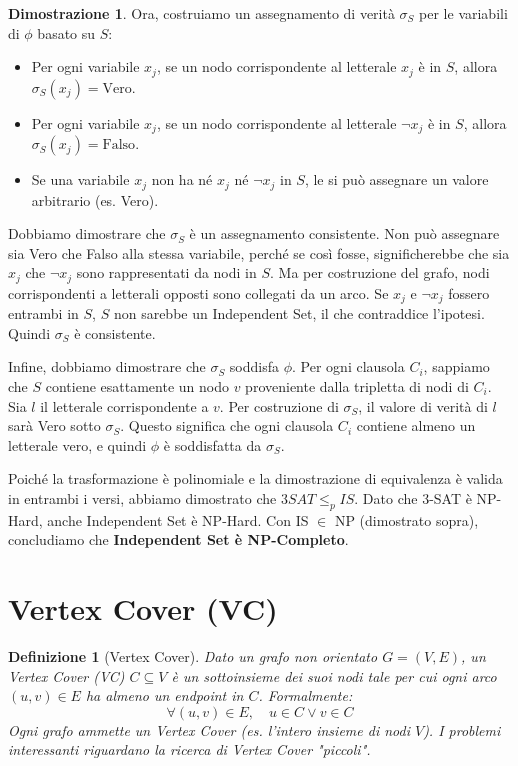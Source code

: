 \documentclass[a4paper]{article}
\newtheorem{definition}{Definizione}[section]
\theoremstyle{definition} %
\newtheorem*{proof*}{Dimostrazione}
\begin{document}
\begin{proof*}
Ora, costruiamo un assegnamento di verità $\sigma_S$ per le variabili di $\phi$ basato su $S$:
\begin{itemize}
    \item Per ogni variabile $x_j$, se un nodo corrispondente al letterale $x_j$ è in $S$, allora $\sigma_S(x_j) = \text{Vero}$.
    \item Per ogni variabile $x_j$, se un nodo corrispondente al letterale $\neg x_j$ è in $S$, allora $\sigma_S(x_j) = \text{Falso}$.
    \item Se una variabile $x_j$ non ha né $x_j$ né $\neg x_j$ in $S$, le si può assegnare un valore arbitrario (es. Vero).
\end{itemize}
Dobbiamo dimostrare che $\sigma_S$ è un assegnamento consistente. Non può assegnare sia Vero che Falso alla stessa variabile, perché se così fosse, significherebbe che sia $x_j$ che $\neg x_j$ sono rappresentati da nodi in $S$. Ma per costruzione del grafo, nodi corrispondenti a letterali opposti sono collegati da un arco. Se $x_j$ e $\neg x_j$ fossero entrambi in $S$, $S$ non sarebbe un Independent Set, il che contraddice l'ipotesi. Quindi $\sigma_S$ è consistente.

Infine, dobbiamo dimostrare che $\sigma_S$ soddisfa $\phi$.
Per ogni clausola $C_i$, sappiamo che $S$ contiene esattamente un nodo $v$ proveniente dalla tripletta di nodi di $C_i$. Sia $l$ il letterale corrispondente a $v$. Per costruzione di $\sigma_S$, il valore di verità di $l$ sarà Vero sotto $\sigma_S$. Questo significa che ogni clausola $C_i$ contiene almeno un letterale vero, e quindi $\phi$ è soddisfatta da $\sigma_S$.

Poiché la trasformazione è polinomiale e la dimostrazione di equivalenza è valida in entrambi i versi, abbiamo dimostrato che $3SAT \le_p IS$. Dato che 3-SAT è NP-Hard, anche Independent Set è NP-Hard. Con IS $\in$ NP (dimostrato sopra), concludiamo che \textbf{Independent Set è NP-Completo}.
\end{proof*}

\section{Vertex Cover (VC)}

\begin{definition}[Vertex Cover]
Dato un grafo non orientato $G=(V, E)$, un \emph{Vertex Cover} (VC) $C \subseteq V$ è un sottoinsieme dei suoi nodi tale per cui ogni arco $(u,v) \in E$ ha almeno un endpoint in $C$. Formalmente:
\[ \forall (u, v) \in E, \quad u \in C \lor v \in C \]
Ogni grafo ammette un Vertex Cover (es. l'intero insieme di nodi $V$). I problemi interessanti riguardano la ricerca di Vertex Cover "piccoli".
\end{definition}
\end{document}
